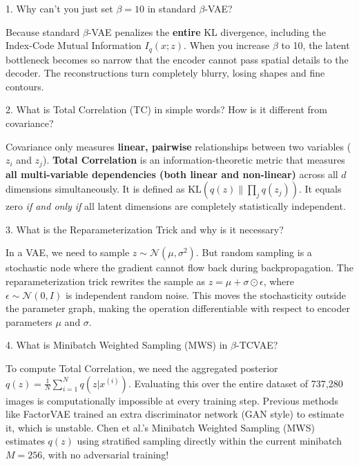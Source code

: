 \documentclass[11pt,a4paper]{article}
\begin{document}
\begin{questionbox}{1. Why can't you just set $\beta = 10$ in standard $\beta$-VAE?}
\begin{answerbox}
Because standard $\beta$-VAE penalizes the \textbf{entire} KL divergence, including the Index-Code Mutual Information $I_q(x; z)$. When you increase $\beta$ to 10, the latent bottleneck becomes so narrow that the encoder cannot pass spatial details to the decoder. The reconstructions turn completely blurry, losing shapes and fine contours.
\end{answerbox}
\end{questionbox}

\begin{questionbox}{2. What is Total Correlation (TC) in simple words? How is it different from covariance?}
\begin{answerbox}
Covariance only measures \textbf{linear, pairwise} relationships between two variables ($z_i$ and $z_j$). \textbf{Total Correlation} is an information-theoretic metric that measures \textbf{all multi-variable dependencies (both linear and non-linear)} across all $d$ dimensions simultaneously. It is defined as $\mathrm{KL}(q(z) \parallel \prod_j q(z_j))$. It equals zero \textit{if and only if} all latent dimensions are completely statistically independent.
\end{answerbox}
\end{questionbox}

\begin{questionbox}{3. What is the Reparameterization Trick and why is it necessary?}
\begin{answerbox}
In a VAE, we need to sample $z \sim \mathcal{N}(\mu, \sigma^2)$. But random sampling is a stochastic node where the gradient cannot flow back during backpropagation. The reparameterization trick rewrites the sample as $z = \mu + \sigma \odot \epsilon$, where $\epsilon \sim \mathcal{N}(0, I)$ is independent random noise. This moves the stochasticity outside the parameter graph, making the operation differentiable with respect to encoder parameters $\mu$ and $\sigma$.
\end{answerbox}
\end{questionbox}

\begin{questionbox}{4. What is Minibatch Weighted Sampling (MWS) in $\beta$-TCVAE?}
\begin{answerbox}
To compute Total Correlation, we need the aggregated posterior $q(z) = \frac{1}{N}\sum_{i=1}^N q(z|x^{(i)})$. Evaluating this over the entire dataset of 737,280 images is computationally impossible at every training step. Previous methods like FactorVAE trained an extra discriminator network (GAN style) to estimate it, which is unstable. Chen et al.'s Minibatch Weighted Sampling (MWS) estimates $q(z)$ using stratified sampling directly within the current minibatch $M=256$, with no adversarial training!
\end{answerbox}
\end{questionbox}
\end{document}
